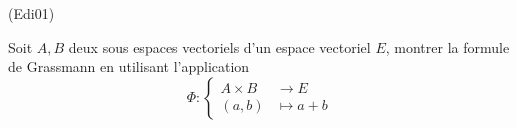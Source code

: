 \begin{tiny}(Edi01)\end{tiny}
Soit $A,B$ deux sous espaces vectoriels d'un espace vectoriel $E$, montrer la formule de Grassmann en utilisant l'application
\[
\Phi :
\left\lbrace 
\begin{aligned}
 A \times B &\rightarrow E \\ (a,b) &\mapsto a + b
\end{aligned}
\right. 
\]